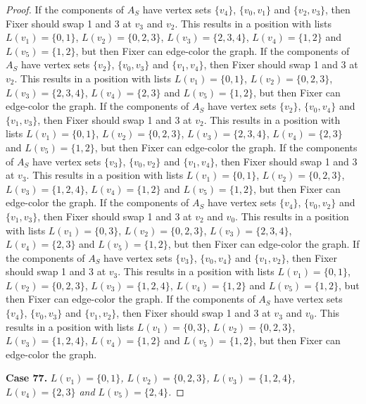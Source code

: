 \documentclass[12pt]{amsart}
\theoremstyle{plain}
\theoremstyle{definition}
\theoremstyle{remark}
\begin{document}
\begin{proof}
If the components of $A_S$ have vertex sets $\{v_4\}$, $\{v_0, v_1\}$ and $\{v_2, v_3\}$, then Fixer should swap 1 and 3 at $v_3$ and $v_2$. This results in a position with lists $L(v_1) = \{0, 1\}$, $L(v_2) = \{0, 2, 3\}$, $L(v_3) = \{2, 3, 4\}$, $L(v_4) = \{1, 2\}$ and $L(v_5) = \{1, 2\}$, but then Fixer can edge-color the graph.
If the components of $A_S$ have vertex sets $\{v_2\}$, $\{v_0, v_3\}$ and $\{v_1, v_4\}$, then Fixer should swap 1 and 3 at $v_2$. This results in a position with lists $L(v_1) = \{0, 1\}$, $L(v_2) = \{0, 2, 3\}$, $L(v_3) = \{2, 3, 4\}$, $L(v_4) = \{2, 3\}$ and $L(v_5) = \{1, 2\}$, but then Fixer can edge-color the graph.
If the components of $A_S$ have vertex sets $\{v_2\}$, $\{v_0, v_4\}$ and $\{v_1, v_3\}$, then Fixer should swap 1 and 3 at $v_2$. This results in a position with lists $L(v_1) = \{0, 1\}$, $L(v_2) = \{0, 2, 3\}$, $L(v_3) = \{2, 3, 4\}$, $L(v_4) = \{2, 3\}$ and $L(v_5) = \{1, 2\}$, but then Fixer can edge-color the graph.
If the components of $A_S$ have vertex sets $\{v_3\}$, $\{v_0, v_2\}$ and $\{v_1, v_4\}$, then Fixer should swap 1 and 3 at $v_3$. This results in a position with lists $L(v_1) = \{0, 1\}$, $L(v_2) = \{0, 2, 3\}$, $L(v_3) = \{1, 2, 4\}$, $L(v_4) = \{1, 2\}$ and $L(v_5) = \{1, 2\}$, but then Fixer can edge-color the graph.
If the components of $A_S$ have vertex sets $\{v_4\}$, $\{v_0, v_2\}$ and $\{v_1, v_3\}$, then Fixer should swap 1 and 3 at $v_2$ and $v_0$. This results in a position with lists $L(v_1) = \{0, 3\}$, $L(v_2) = \{0, 2, 3\}$, $L(v_3) = \{2, 3, 4\}$, $L(v_4) = \{2, 3\}$ and $L(v_5) = \{1, 2\}$, but then Fixer can edge-color the graph.
If the components of $A_S$ have vertex sets $\{v_3\}$, $\{v_0, v_4\}$ and $\{v_1, v_2\}$, then Fixer should swap 1 and 3 at $v_3$. This results in a position with lists $L(v_1) = \{0, 1\}$, $L(v_2) = \{0, 2, 3\}$, $L(v_3) = \{1, 2, 4\}$, $L(v_4) = \{1, 2\}$ and $L(v_5) = \{1, 2\}$, but then Fixer can edge-color the graph.
If the components of $A_S$ have vertex sets $\{v_4\}$, $\{v_0, v_3\}$ and $\{v_1, v_2\}$, then Fixer should swap 1 and 3 at $v_3$ and $v_0$. This results in a position with lists $L(v_1) = \{0, 3\}$, $L(v_2) = \{0, 2, 3\}$, $L(v_3) = \{1, 2, 4\}$, $L(v_4) = \{1, 2\}$ and $L(v_5) = \{1, 2\}$, but then Fixer can edge-color the graph.

\noindent\textbf{Case 77.  }\textit{$L(v_1) = \{0, 1\}$, $L(v_2) = \{0, 2, 3\}$, $L(v_3) = \{1, 2, 4\}$, $L(v_4) = \{2, 3\}$ and $L(v_5) = \{2, 4\}$.}


\end{proof}
\end{document}
